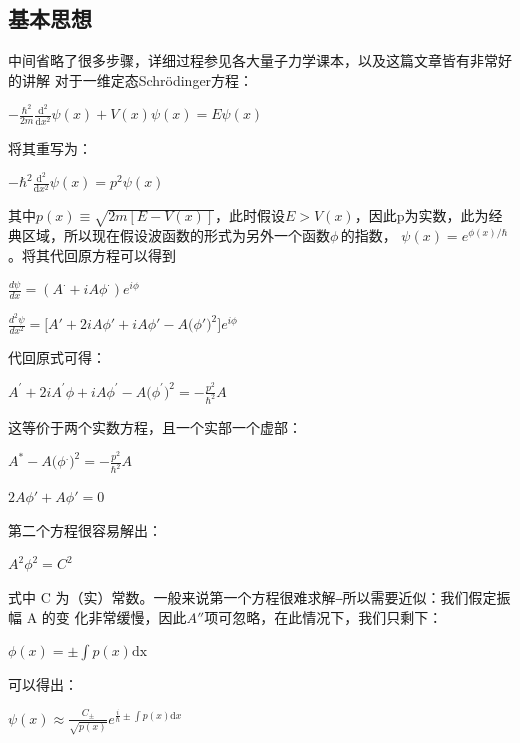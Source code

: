 \documentclass[12pt]{article}
\begin{document}
\subsection{基本思想}
中间省略了很多步骤，详细过程参见各大量子力学课本\cite{griffiths_schroeter_2018}，以及这篇文章皆有非常好的讲解\cite{LU2018502}
对于一维定态Schrödinger方程：
\begin{center}
    $\displaystyle - \frac{\hbar^2}{2m} \frac{\mathrm{d}^2}{\mathrm{d}x^2} \psi(x) + V(x) \psi(x) = E \psi(x)\,\!$
\end{center}
将其重写为：
\begin{center}
    $\displaystyle -\hbar^2\frac{\mathrm{d}^2}{\mathrm{d}x^2} \psi(x) =p^2\psi(x)\,\!$
\end{center}
其中$p(x)\equiv \sqrt{2m[E-V(x)]}$，此时假设$E>V(x)$，因此p为实数，此为经典区域，所以现在假设波函数的形式为另外一个函数$\phi\,\!$的指数，
$\displaystyle \psi(x) = e^{\phi(x)/\hbar} \,\!$。将其代回原方程可以得到
\begin{center}
    $\displaystyle\frac{d\psi}{dx}=\left(A^\cdot+i A\phi^\cdot\right)e^{i\phi}$
\end{center}
\begin{center}
    $\displaystyle\frac{d^2\psi}{dx^2}=\bigg[A'+2i A\phi'+i A\phi'-A\Big(\phi'\Big)^2\bigg]e^{i\phi}$
\end{center}
代回原式可得：
\begin{center}
    $\displaystyle A^{'}+2i A^{'}\phi+i A\phi^{'}-A\Big(\phi^{'}\Big)^{2}=-\frac{p^{2}}{\hbar^{2}}A$
\end{center}
这等价于两个实数方程，且一个实部一个虚部：
\begin{center}
    $\displaystyle A^*-A\Big(\phi^.\Big)^2=-\frac{p^2}{\hbar^2}A$
\end{center}
\begin{center}
    $2A\phi'+A\phi'=0$
\end{center}
第二个方程很容易解出：
\begin{center}
    $A^2\phi^2=C^2$
\end{center}
式中 C 为（实）常数。一般来说第一个方程很难求解⎯所以需要近似：我们假定振幅 A 的变
化非常缓慢，因此$A''$项可忽略，在此情况下，我们只剩下：
\begin{center}
    $\displaystyle\phi(x) = \pm \int p(x) \mathrm{dx}$
\end{center}
可以得出：
\begin{center}
    $\displaystyle\psi(x) \approx  \frac{C_{\pm}} {\sqrt{p(x)}}  e^{\frac{i}{\hbar}\pm\int p(x) \mathrm{d}x}$
\end{center}
\end{document}
